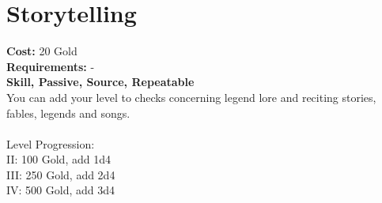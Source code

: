 \section{Storytelling}
\textbf{Cost:} 20 Gold\\
\textbf{Requirements:} -\\
\textbf{Skill, Passive, Source, Repeatable}\\
You can add your level to checks concerning legend lore and reciting stories, fables, legends and songs.\\ 
\\
Level Progression:\\
II: 100 Gold, add 1d4\\
III: 250 Gold, add 2d4\\
IV: 500 Gold, add 3d4\\